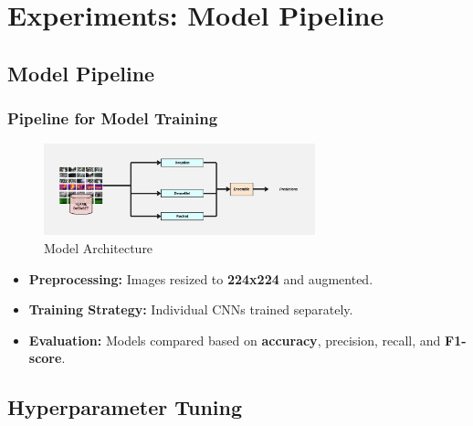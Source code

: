 \section{Experiments: Model Pipeline}
\label{sec:experiments}

\subsection{Model Pipeline}
\label{subsec:pipeline}

\begin{frame}
    \frametitle{Pipeline for Model Training}
    \begin{figure}
        \centering
        \includegraphics[width=0.7\textwidth]{images/model}
        \caption{Model Architecture}\label{fig:model}
    \end{figure}
    \begin{itemize}
        \item \textbf{Preprocessing:} Images resized to \textbf{224x224} and augmented.
        \item \textbf{Training Strategy:} Individual CNNs trained separately.
        \item \textbf{Evaluation:} Models compared based on \textbf{accuracy}, precision, recall, and \textbf{F1-score}.
    \end{itemize}
\end{frame}

\subsection{Hyperparameter Tuning}
\label{subsec:hyper-tuning}

